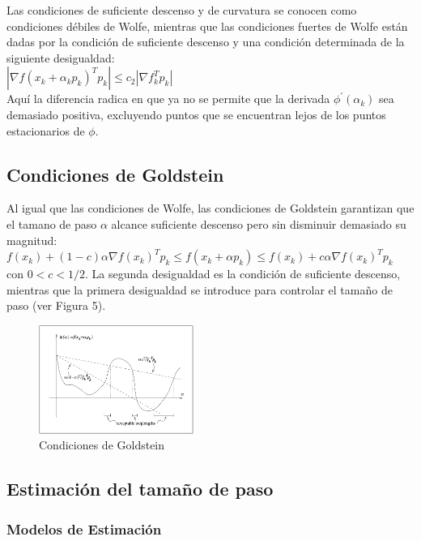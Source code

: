 \documentclass[10pt,journal,compsoc]{styles/IEEEtran}
\begin{document}
Las condiciones de suficiente descenso y de curvatura se conocen como condiciones d\'ebiles de Wolfe, mientras que las condiciones fuertes de Wolfe est\'an dadas por la condici\'on de suficiente descenso y una condici\'on determinada de la siguiente desigualdad:\\

 $|\nabla f(x_k+\alpha_k p_k)^Tp_k| \leq c_2| \nabla f_k^T p_k|$\\
 
Aqu\'i la diferencia radica en que ya no se permite que la derivada $\phi^{'}(\alpha_k)$ sea demasiado positiva, excluyendo puntos que se encuentran lejos de los puntos estacionarios de $\phi$.
 
 \subsection{Condiciones de Goldstein}
 
 Al igual que las condiciones de Wolfe, las condiciones de Goldstein garantizan que el tamano de paso $\alpha$ alcance suficiente descenso pero sin disminuir demasiado su magnitud:\\
 
 $f(x_k)+(1-c)\alpha\nabla f(x_k)^T p_k \leq f(x_k+\alpha p_k) \leq f(x_k)+c \alpha \nabla f(x_k)^T p_k$\\
 
 con $0<c<1/2$. La segunda desigualdad es la condici\'on de suficiente descenso, mientras que la primera desigualdad se introduce para controlar el tama\~no de paso (ver Figura 5).
 
\begin{figure}[hbtp]
\centering
\includegraphics[width=0.45\textwidth]{goldstein.png}
\caption{Condiciones de Goldstein}
\end{figure}
 
\subsection{Estimaci\'on del tama\~no de paso}

\subsubsection{Modelos de Estimaci\'on}
\end{document}
